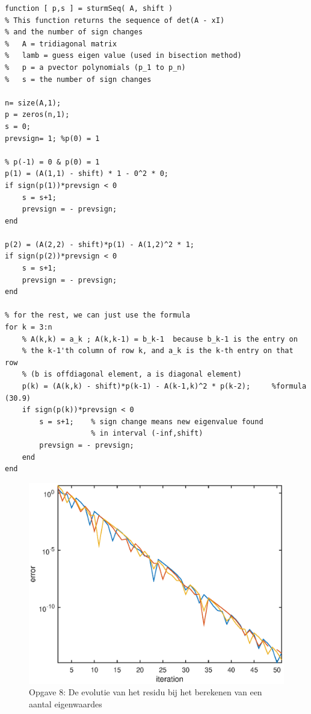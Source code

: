 \documentclass[]{article}
\begin{document}
\begin{framed}
\begin{lstlisting}
function [ p,s ] = sturmSeq( A, shift )
% This function returns the sequence of det(A - xI) 
% and the number of sign changes
%   A = tridiagonal matrix
%   lamb = guess eigen value (used in bisection method)
%   p = a pvector polynomials (p_1 to p_n)
%   s = the number of sign changes

n= size(A,1);
p = zeros(n,1);
s = 0; 
prevsign= 1; %p(0) = 1

% p(-1) = 0 & p(0) = 1
p(1) = (A(1,1) - shift) * 1 - 0^2 * 0;  
if sign(p(1))*prevsign < 0
    s = s+1; 
    prevsign = - prevsign;
end

p(2) = (A(2,2) - shift)*p(1) - A(1,2)^2 * 1;
if sign(p(2))*prevsign < 0
    s = s+1; 
    prevsign = - prevsign;
end

% for the rest, we can just use the formula
for k = 3:n
    % A(k,k) = a_k ; A(k,k-1) = b_k-1  because b_k-1 is the entry on 
    % the k-1'th column of row k, and a_k is the k-th entry on that row 
    % (b is offdiagonal element, a is diagonal element)
    p(k) = (A(k,k) - shift)*p(k-1) - A(k-1,k)^2 * p(k-2);     %formula (30.9)
    if sign(p(k))*prevsign < 0 
        s = s+1; 	% sign change means new eigenvalue found 
        			% in interval (-inf,shift)
        prevsign = - prevsign;
    end
end
\end{lstlisting}
\label{matlabSturm}
\end{framed}

\begin{figure}
\begin{center}
\includegraphics[width=1\textwidth]{opgave8.eps}
\end{center}
\caption{Opgave 8: De evolutie van het residu bij het berekenen van een aantal eigenwaardes}
\label{opgave8}
\end{figure}
\end{document}
